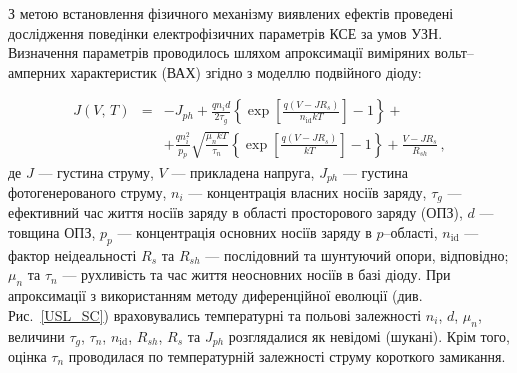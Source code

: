 \documentclass[a5paper,10pt,twoside,openany,article]{memoir} %
\begin{document}
З метою встановлення фізичного механізму виявлених ефектів проведені дослідження поведінки електрофізичних параметрів КСЕ за умов УЗН.
Визначення параметрів проводилось шляхом апроксимації виміряних вольт--амперних характеристик (ВАХ) згідно з моделлю подвійного діоду:

\begin{eqnarray}
\label{eqSSCIV}
\nonumber J(V,\,T)&=&-J_{ph}+\frac{qn_id}{2\tau_{g}}\left\{\exp \left[\frac{q(V-JR_s)}{n_\mathrm{id}kT}\right]-1\right\}+\\
&&+\frac{qn_i^2}{p_p}\sqrt{\frac{\mu_nkT}{\tau_n}}\left\{\exp \left[\frac{q(V-JR_s)}{kT}\right]-1\right\}+\frac{V-JR_s}{R_{sh}}\,,
\end{eqnarray}
де
$J$ --- густина струму,
$V$ --- прикладена напруга,
$J_{ph}$ --- густина фотогенерованого струму,
$n_i$ --- концентрація власних носіїв заряду,
$\tau_{g}$  --- ефективний час життя носіїв заряду в області просторового заряду (ОПЗ),
$d$ --- товщина ОПЗ,
$p_p$ --- концентрація основних носіїв заряду в $p$--області,
$n_\mathrm{id}$ --- фактор неідеальності
$R_s$ та $R_{sh}$ --- послідовний та шунтуючий опори, відповідно;
$\mu_n$ та $\tau_n$ --- рухливість та час життя неосновних носіїв в базі діоду.
При апроксимації з використанням методу диференційної еволюції (див. Рис.~\ref{USL_SC}) враховувались температурні та польові залежності $n_i$,
$d$, $\mu_n$, величини  $\tau_g$, $\tau_n$, $n_{\mathrm{id}}$, $R_{sh}$, $R_s$ та  $J_{ph}$ розглядалися як невідомі (шукані).
Крім того, оцінка $\tau_n$ проводилася по температурній залежності струму короткого замикання.
\end{document}

